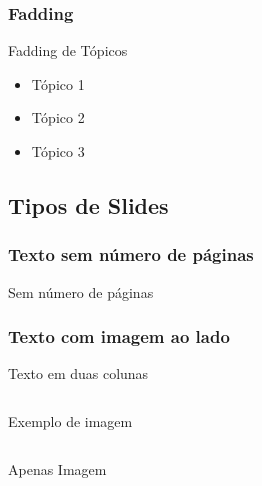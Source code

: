 \documentclass[aspectratio=169]{beamer}
\begin{document}
\subsubsection{Fadding}

\begin{frame}{Fadding de Tópicos}
    \begin{itemize}
        \item Tópico 1 \pause
        \item Tópico 2 \pause
        \item Tópico 3 
    \end{itemize}
\end{frame}



\subsection{Tipos de Slides}
\subsubsection{Texto sem número de páginas}

\begin{frame}[plain]{Sem número de páginas}
\lipsum[1]
\end{frame}


\subsubsection{Texto com imagem ao lado}
\begin{frame}{Texto em duas colunas}
  \begin{columns}[c]
    \begin{column}{.5\textwidth}

	Exemplo de imagem

    \end{column}
    \begin{column}{.5\textwidth}


    \end{column}
  \end{columns}
\end{frame}

\begin{frame}{Apenas Imagem}

    
\end{frame}
\end{document}
